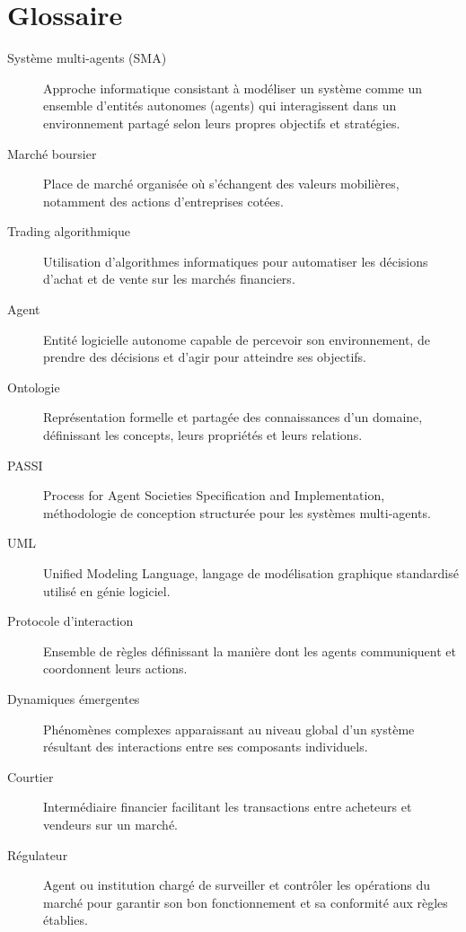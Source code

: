 \chapter*{Glossaire}

\begin{description}
    \item[Système multi-agents (SMA)] Approche informatique consistant à modéliser un système comme un ensemble d'entités autonomes (agents) qui interagissent dans un environnement partagé selon leurs propres objectifs et stratégies.
    
    \item[Marché boursier] Place de marché organisée où s'échangent des valeurs mobilières, notamment des actions d'entreprises cotées.
    
    \item[Trading algorithmique] Utilisation d'algorithmes informatiques pour automatiser les décisions d'achat et de vente sur les marchés financiers.
    
    \item[Agent] Entité logicielle autonome capable de percevoir son environnement, de prendre des décisions et d'agir pour atteindre ses objectifs.
    
    \item[Ontologie] Représentation formelle et partagée des connaissances d'un domaine, définissant les concepts, leurs propriétés et leurs relations.
    
    \item[PASSI] Process for Agent Societies Specification and Implementation, méthodologie de conception structurée pour les systèmes multi-agents.
    
    \item[UML] Unified Modeling Language, langage de modélisation graphique standardisé utilisé en génie logiciel.
    
    \item[Protocole d'interaction] Ensemble de règles définissant la manière dont les agents communiquent et coordonnent leurs actions.
    
    \item[Dynamiques émergentes] Phénomènes complexes apparaissant au niveau global d'un système résultant des interactions entre ses composants individuels.
    
    \item[Courtier] Intermédiaire financier facilitant les transactions entre acheteurs et vendeurs sur un marché.
    
    \item[Régulateur] Agent ou institution chargé de surveiller et contrôler les opérations du marché pour garantir son bon fonctionnement et sa conformité aux règles établies.
\end{description}